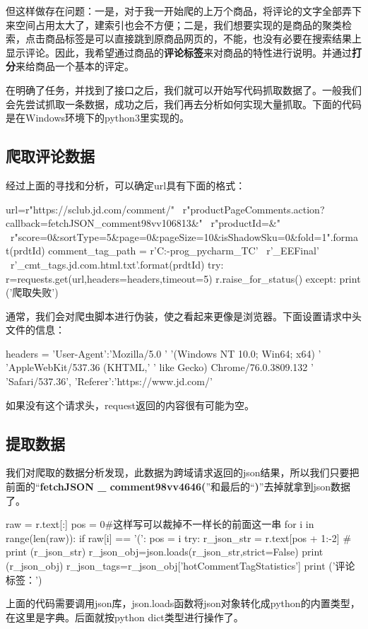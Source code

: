 但这样做存在问题：一是，对于我一开始爬的上万个商品，将评论的文字全部弄下来空间占用太大了，建索引也会不方便；二是，我们想要实现的是商品的聚类检索，点击商品标签是可以直接跳到原商品网页的，不能，也没有必要在搜索结果上显示评论。因此，我希望通过商品的\textbf{评论标签}来对商品的特性进行说明。并通过\textbf{打分}来给商品一个基本的评定。

在明确了任务，并找到了接口之后，我们就可以开始写代码抓取数据了。一般我们会先尝试抓取一条数据，成功之后，我们再去分析如何实现大量抓取。下面的代码是在Windows环境下的python3里实现的。

\subsection{爬取评论数据}
经过上面的寻找和分析，可以确定url具有下面的格式：
\begin{python}
url=r"https://sclub.jd.com/comment/" \
    r"productPageComments.action?callback=fetchJSON_comment98vv106813&" \
    r"productId={}&" \
    r"score=0&sortType=5&page=0&pageSize=10&isShadowSku=0&fold=1".format(prdtId)
comment_tag_path = r'C:\TC-prog\JetBrain_pycharm_TC' \
                   r'\PycharmProjects\Crawler_EEFinal' \
                   r'\jd_cmt_tags\httpsitem.jd.com{}.html.txt'.format(prdtId)
try:
    r=requests.get(url,headers=headers,timeout=5)
    r.raise_for_status()
except:
    print ('爬取失败')
\end{python}
通常，我们会对爬虫脚本进行伪装，使之看起来更像是浏览器。下面设置请求中头文件的信息：
\begin{python}
headers = {'User-Agent':'Mozilla/5.0 '
                        '(Windows NT 10.0; Win64; x64) '
                        'AppleWebKit/537.36 (KHTML,'
                        ' like Gecko) Chrome/76.0.3809.132 '
                        'Safari/537.36',
                        'Referer':'https://www.jd.com/'
}
\end{python}
如果没有这个请求头，request返回的内容很有可能为空。

\subsection{提取数据}
我们对爬取的数据分析发现，此数据为跨域请求返回的json结果，所以我们只要把前面的“\textbf{fetchJSON \_ comment98vv4646(}”和最后的“\textbf{)}”去掉就拿到json数据了。

\begin{python}
raw = r.text[:]
pos = 0#这样写可以裁掉不一样长的前面这一串
for i in range(len(raw)):
    if raw[i] == '(':
        pos = i
try:
    r_json_str = r.text[pos + 1:-2]
    # print (r_json_str)
    r_json_obj=json.loads(r_json_str,strict=False)
    print (r_json_obj)
    r_json_tags=r_json_obj['hotCommentTagStatistics']
    print ('评论标签：')
\end{python}
上面的代码需要调用json库，json.loads函数将json对象转化成python的内置类型，在这里是字典。后面就按python dict类型进行操作了。

